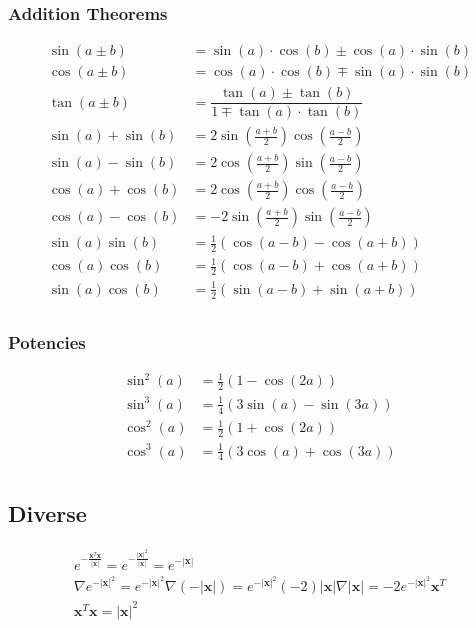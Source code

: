 \subsubsection{Addition Theorems}
\begin{align*}
	\sin(a \pm b)&=\sin(a) \cdot \cos(b) \pm \cos(a) \cdot \sin(b)\\
	\cos(a \pm b)&=\cos(a) \cdot \cos(b) \mp \sin(a) \cdot \sin(b)\\	
	\tan(a \pm b)&=\dfrac{\tan(a) \pm \tan(b)}{1 \mp \tan(a) \cdot \tan(b)}\\
	\sin(a)+\sin(b) &= 2\sin\left(\frac{a + b}{2}\right)\cos\left(\frac{a - b}{2}\right)\\
	\sin(a)-\sin(b) &= 2\cos\left(\frac{a + b}{2}\right)\sin\left(\frac{a - b}{2}\right)\\
	\cos(a)+\cos(b) &= 2\cos\left(\frac{a + b}{2}\right)\cos\left(\frac{a - b}{2}\right)\\
	\cos(a)-\cos(b) &= -2\sin\left(\frac{a + b}{2}\right)\sin\left(\frac{a - b}{2}\right)\\
	\sin(a)\sin(b)&=\frac{1}{2}(\cos(a-b)-\cos(a+b))\\
	\cos(a)\cos(b)&=\frac{1}{2}(\cos(a-b)+\cos(a+b))\\
	\sin(a)\cos(b)&=\frac{1}{2}(\sin(a-b)+\sin(a+b))\\
\end{align*}

\subsubsection{Potencies}
\begin{align*}
	\sin^2(a) &= \frac{1}{2}(1 - \cos(2a)) \\
	\sin^3(a) &= \frac{1}{4}(3\sin(a) - \sin(3a)) \\
	\cos^2(a) &= \frac{1}{2}(1 + \cos(2a)) \\
	\cos^3(a) &= \frac{1}{4}(3\cos(a) + \cos(3a)) \\
\end{align*}

\subsection{Diverse}
\begin{align*}
	e^{-\frac{\mathbf{x}^T\mathbf{x}}{\left|\mathbf{x}\right|}} = e^{-\frac{\left|\mathbf{x}\right|^2}{\left|\mathbf{x}\right|}} = e^{-\left|\mathbf{x}\right|} \\
	\nabla e^{-\left|\mathbf{x}\right|^2} = e^{-\left|\mathbf{x}\right|^2} \nabla \left(-\left|\mathbf{x}\right|\right) = e^{-\left|\mathbf{x}\right|^2} (-2) \left|\mathbf{x}\right| \nabla \left|\mathbf{x}\right| = -2e^{-\left|\mathbf{x}\right|^2} \mathbf{x}^T \\
	\mathbf{x}^T\mathbf{x} = \left|\mathbf{x}\right|^2	
\end{align*}

